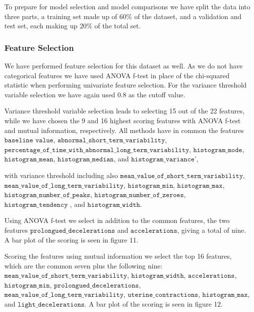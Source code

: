 \documentclass[11pt]{article}
\begin{document}
To prepare for model selection and model comparisons we have split the data into three parts, a
training set made up of $60\%$ of the dataset, and a validation and test set, each making up $20\%$ of
the total set.

    \hypertarget{feature-selection2}{%
	\subsubsection{Feature Selection}\label{feature-selection2}}
 We have performed feature selection for this dataset as well. As we do not have categorical features we have used ANOVA f-test in place of the chi-squared statistic when performing univariate feature selection. For the variance threshold variable selection we have again used 0.8 as the cutoff value.
 
Variance threshold variable selection leads to selecting 15 out of the 22 features, while we have chosen the 9 and 16 highest scoring features with ANOVA f-test and mutual information, respectively. All methods have in common the features $\texttt{baseline value}$, $\texttt{abnormal\_short\_term\_variability}$, $\texttt{percentage\_of\_time\_with\_abnormal\_long\_term\_variability}$, $\texttt{histogram\_mode}$, $\texttt{histogram\_mean}$, $\texttt{histogram\_median}$, and $\texttt{histogram\_variance}$',

 with variance threshold including also $\texttt{mean\_value\_of\_short\_term\_variability}$, $\texttt{mean\_value\_of\_long\_term\_variability}$, $\texttt{histogram\_min}$,  $\texttt{histogram\_max}$, $\texttt{histogram\_number\_of\_peaks}$, $\texttt{histogram\_number\_of\_zeroes}$, $\texttt{histogram\_tendency}$ , and $\texttt{histogram\_width}$.
 
 
 Using ANOVA f-test we select in addition to the common features, the two features $\texttt{prolongued\_decelerations}$ and $\texttt{accelerations}$, giving a total of nine. A bar plot of the scoring is seen in figure 11.
 
 Scoring the features using mutual information we select the top 16 features, which are the common seven plus the following nine: $\texttt{mean\_value\_of\_short\_term\_variability}$, $\texttt{histogram\_width}$, $\texttt{accelerations}$, $\texttt{histogram\_min}$, $\texttt{prolongued\_decelerations}$, $\texttt{mean\_value\_of\_long\_term\_variability}$, $\texttt{uterine\_contractions}$, $\texttt{histogram\_max}$, and $\texttt{light\_decelerations}$. A bar plot of the scoring is seen in figure 12.
 
\end{document}
